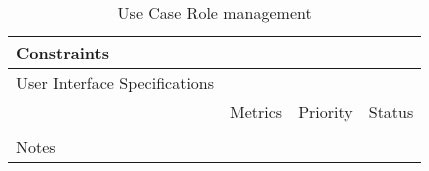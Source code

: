 \begin{table}[H]
\begin{tabularx}{\linewidth}{|l|X|X|X|}
    \hline Constraints                   & \multicolumn{3}{l|}{}                                                                                 \\

    \hline User Interface Specifications & \multicolumn{3}{l|}{}                                                                                 \\

    \hline \multirow{2}{*}{}             & Metrics                                                                           & Priority & Status \\
    \cline{2-4}                          &                                                                                   &          &        \\
    \hline Notes                         & \multicolumn{3}{l|}{}                                                                                 \\
    \hline
  \end{tabularx}
  \caption{Use Case Role management}
  \label{tab:use_case_role_management}
\end{table}

